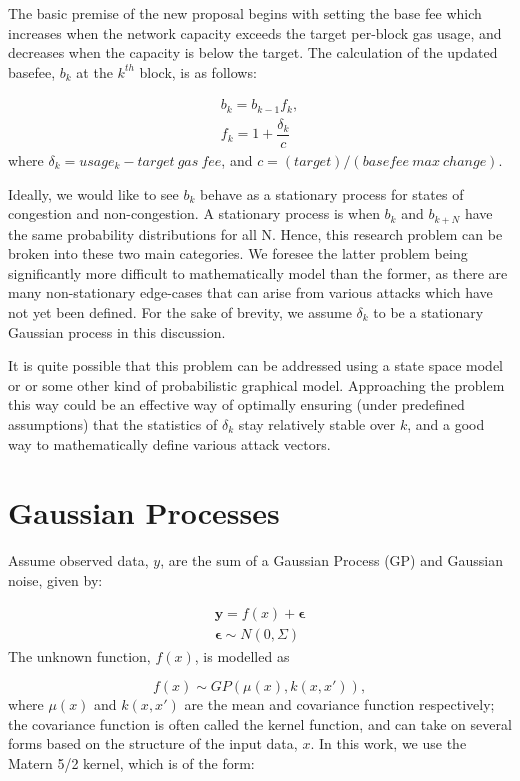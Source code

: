 \documentclass[peerreview]{ieeesyscoin}
\begin{document}
The basic premise of the new proposal begins with setting the base fee which increases when the network capacity exceeds the target per-block gas usage, and decreases when the capacity is below the target. The calculation of the updated basefee, $b_{k}$ at the $k^{th}$ block,  is as follows:

\begin{eqnarray} \label{eq:eip1559}
b_{k} = b_{k-1} f_{k}, \\
f_{k} = 1 + \dfrac{\delta_{k}}{c}
\end{eqnarray}
where $\delta_{k} = usage_{k} - target~gas~fee$, and $c = (target)/(basefee~max~change)$.

Ideally, we would like to see $b_{k}$ behave as a stationary process for states of congestion and non-congestion. A stationary process is when $b_{k}$ and $b_{k+N}$ have the same probability distributions for all N. Hence, this research problem can be broken into these two main categories. We foresee the latter problem being significantly more difficult to mathematically model than the former, as there are many non-stationary edge-cases that can arise from various attacks which have not yet been defined. For the sake of brevity, we assume $\delta_{k}$ to be a stationary Gaussian process in this discussion.

It is quite possible that this problem can be addressed using a state space model or or some other kind of probabilistic graphical model. Approaching the problem this way could be an effective way of optimally ensuring (under predefined assumptions) that the statistics of $\delta_{k}$ stay relatively stable over $k$, and a good way to mathematically define various attack vectors.

\section{Gaussian Processes}
\label{appendix:marginal}

Assume observed data, $y$, are the sum of a Gaussian Process (GP) and Gaussian noise, given by:

\begin{eqnarray}
\mathbf{y} = f(x) + \mathbf{\epsilon}  \\
\mathbf{\epsilon}  \sim N(0,\Sigma) 
\end{eqnarray}
The unknown function, $f(x)$, is modelled as

\begin{equation}
f(x) \sim GP(\mu(x), k(x,x')),
\end{equation}
where $\mu(x)$ and $k(x,x')$ are the mean and covariance function respectively; the covariance function is often called the kernel function, and can take on several forms based on the structure of the input data, $x$. In this work, we use the Matern 5/2 kernel, which is of the form:
\end{document}
